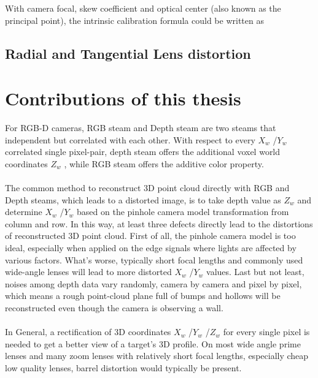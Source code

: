 With camera focal, skew coefficient and optical center (also known as the principal point), the intrinsic calibration formula could be written as



\subsection{Radial and Tangential Lens distortion}





\section{Contributions of this thesis}

For RGB-D cameras, RGB steam and Depth steam are two steams that independent but correlated with each other. With respect to every \(X_{w}\) /\(Y_{w}\)  correlated single pixel-pair, depth steam offers the additional voxel world coordinates \(Z_{w}\) , while RGB steam offers the additive color property.
\\
\\ The common method to reconstruct 3D point cloud directly with RGB and Depth steams, which leads to a distorted image, is to take depth value as \(Z_{w}\)  and determine \(X_{w}\) /\(Y_{w}\)  based on the pinhole camera model transformation from column and row. In this way, at least three defects directly lead to the distortions of reconstructed 3D point cloud. First of all, the pinhole camera model is too ideal, especially when applied on the edge signals where lights are affected by various factors. What's worse,  typically short focal lengths and commonly used wide-angle lenses will lead to more distorted \(X_{w}\) /\(Y_{w}\)  values. Last but not least, noises among depth data vary randomly, camera by camera and pixel by pixel, which means a rough point-cloud plane full of bumps and hollows will be reconstructed even though the camera is observing a wall. 
\\
\\In General, a rectification of 3D coordinates \(X_{w}\) /\(Y_{w}\) /\(Z_{w}\)  for every single pixel is needed to get a better view of a target's 3D profile. 
 On most wide angle prime lenses and many zoom lenses with relatively short focal lengths,  especially cheap low quality lenses, barrel distortion would typically be present.
 
